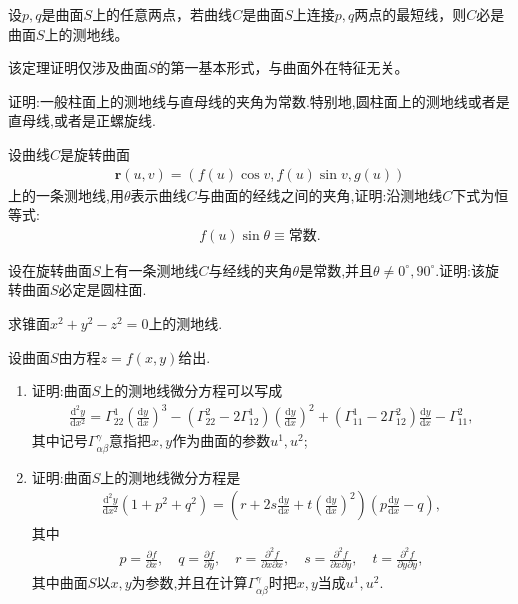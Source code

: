 \documentclass[../../main.tex]{subfiles}%
\begin{document}
\begin{corollary}
设$p,q$是曲面$S$上的任意两点，若曲线$C$是曲面$S$上连接$p,q$两点的最短线，则$C$必是曲面$S$上的测地线。
\end{corollary}
\begin{remark}
该定理证明仅涉及曲面$S$的第一基本形式，与曲面外在特征无关。
\end{remark}

\begin{example}
证明:一般柱面上的测地线与直母线的夹角为常数.特别地,圆柱面上的测地线或者是直母线,或者是正螺旋线.
\end{example}

\begin{example}
设曲线$C$是旋转曲面
\begin{align*}
\boldsymbol{r}(u,v)=(f(u)\cos v,f(u)\sin v,g(u))
\end{align*}
上的一条测地线,用$\theta$表示曲线$C$与曲面的经线之间的夹角,证明:沿测地线$C$下式为恒等式:
\begin{align*}
f(u)\sin\theta \equiv \text{常数}.
\end{align*}
\end{example}

\begin{example}
设在旋转曲面$S$上有一条测地线$C$与经线的夹角$\theta$是常数,并且$\theta \neq 0^\circ,90^\circ$.证明:该旋转曲面$S$必定是圆柱面.
\end{example}

\begin{example}
求锥面$x^2+y^2-z^2=0$上的测地线.
\end{example}

\begin{example}
设曲面$S$由方程$z=f(x,y)$给出.
\begin{enumerate}[(1)]
\item 证明:曲面$S$上的测地线微分方程可以写成
\begin{align*}
\frac{\mathrm{d}^2y}{\mathrm{d}x^2} = \Gamma_{22}^{1}\left(\frac{\mathrm{d}y}{\mathrm{d}x}\right)^{3} - \left(\Gamma_{22}^{2}-2\Gamma_{12}^{1}\right)\left(\frac{\mathrm{d}y}{\mathrm{d}x}\right)^{2} + \left(\Gamma_{11}^{1}-2\Gamma_{12}^{2}\right)\frac{\mathrm{d}y}{\mathrm{d}x} - \Gamma_{11}^{2},
\end{align*}
其中记号$\Gamma_{\alpha\beta}^{\gamma}$意指把$x,y$作为曲面的参数$u^1,u^2$;
\item 证明:曲面$S$上的测地线微分方程是
\begin{align*}
\frac{\mathrm{d}^2y}{\mathrm{d}x^2}(1+p^2+q^2) = \left(r+2s\frac{\mathrm{d}y}{\mathrm{d}x}+t\left(\frac{\mathrm{d}y}{\mathrm{d}x}\right)^{2}\right)\left(p\frac{\mathrm{d}y}{\mathrm{d}x}-q\right),
\end{align*}
其中
\begin{align*}
p=\frac{\partial f}{\partial x},\quad q=\frac{\partial f}{\partial y},\quad r=\frac{\partial^2 f}{\partial x\partial x},\quad s=\frac{\partial^2 f}{\partial x\partial y},\quad t=\frac{\partial^2 f}{\partial y\partial y},
\end{align*}
其中曲面$S$以$x,y$为参数,并且在计算$\Gamma_{\alpha\beta}^{\gamma}$时把$x,y$当成$u^1,u^2$.
\end{enumerate}
\end{example}
\end{document}
